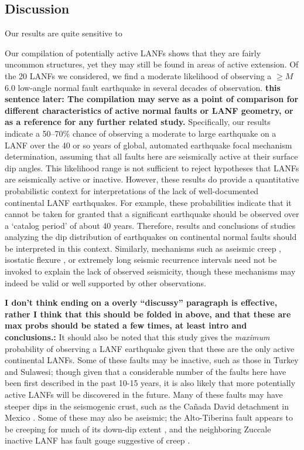 \documentclass[twocolumn,grl]{AGUTeX}
\begin{document}
\begin{article}
\section{Discussion}
Our results are quite sensitive to 

Our compilation of potentially active LANFs shows that they are fairly
uncommon structures, yet they may still be found in areas of active
extension. Of the 20 LANFs we considered, we find a moderate
likelihood of observing a $\ge M$6.0 low-angle normal fault earthquake
in several decades of observation.  {\bf this sentence later: The
  compilation may serve as a point of comparison for different
  characteristics of active normal faults or LANF geometry, or as a
  reference for any further related study.} Specifically, our results
indicate a 50--70\% chance of observing a moderate to large earthquake
on a LANF over the 40 or so years of global, automated earthquake
focal mechanism determination, assuming that all faults here are
seismically active at their surface dip angles.  This likelihood range
is not sufficient to reject hypotheses that LANFs are seismically
active or inactive. However, these results do provide a quantitative
probabilistic context for interpretations of the lack of
well-documented continental LANF earthquakes.  For example, these
probabilities indicate that it cannot be taken for granted that a
significant earthquake should be observed over a `catalog period' of
about 40 years. Therefore, results and conclusions of studies
analyzing the dip distribution of earthquakes on continental normal
faults \citep{jackson1987, collettinisibson2001} should be interpreted
in this context.  Similarly, mechanisms such as aseismic creep \citep
[e.g.,][]{collettini2011lanfmech, hreinsdottir2009altotib}, isostatic
flexure \citep[e.g.,][] {wernickeaxen1988rolling}, or extremely long
seismic recurrence intervals \citep{wernicke1995seis} need not be
invoked to explain the lack of observed seismicity, though these
mechanisms may indeed be valid or well supported by other
observations.

{\bf I don't think ending on a overly ``discussy'' paragraph is
  effective, rather I think that this should be folded in above, and
  that these are max probs should be stated a few times, at least
  intro and conclusions.:} It should also be noted that this study
gives the \emph{maximum} probability of observing a LANF earthquake
given that these are the only active continental LANFs.  Some of these
faults may be inactive, such as those in Turkey and Sulawesi; though
given that a considerable number of the faults here have been first
described in the past 10-15 years, it is also likely that more
potentially active LANFs will be discovered in the future.  Many of
these faults may have steeper dips in the seismogenic crust, such as
the Ca\~nada David detachment in Mexico \citep{fletcherspelz2009}.
Some of these may also be aseismic; the Alto-Tiberina fault appears to
be creeping for much of its down-dip extent
\citep{hreinsdottir2009altotib}, and the neighboring Zuccale inactive
LANF has fault gouge suggestive of creep
\citep{collettiniholdsworth2004}.


\end{article}
\end{document}
